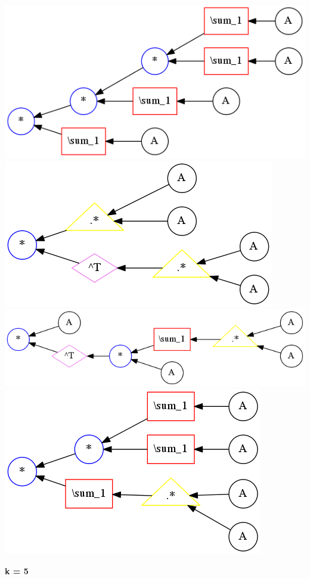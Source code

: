 \begin{center}
\includegraphics[width=0.45\linewidth]{trees/RBMOneSide_4_horizontal_0.png}
\includegraphics[width=0.45\linewidth]{trees/RBMOneSide_4_horizontal_1.png}
\includegraphics[width=0.45\linewidth]{trees/RBMOneSide_4_horizontal_2.png}
\includegraphics[width=0.45\linewidth]{trees/RBMOneSide_4_horizontal_3.png}
\end{center}


{\bf k = 5}


